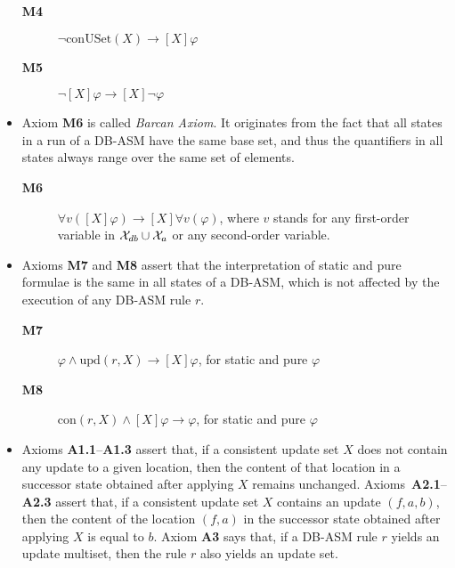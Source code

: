 \documentclass[preprint,11pt]{elsarticle}
\theoremstyle{definition}
\theoremstyle{remark}
\begin{document}
\begin{itemize}
\begin{description}
  \item[\textbf{M4}] $\neg \mathrm{conUSet}(X)\rightarrow[X]\varphi $ \smallskip


  \item[\textbf{M5}] $\neg[X]\varphi\rightarrow [X]\neg\varphi$ \smallskip

\end{description}

\item Axiom \textbf{M6} is called \emph{Barcan Axiom}. It originates from the fact that all
states in a run of a DB-ASM have the same base set, and thus the
quantifiers in all states always range over the same set of
elements. 

\begin{description}

\item[\textbf{M6}] $\forall v ([X]\varphi)\rightarrow [X]\forall
v(\varphi)$, where $v$ stands for any first-order variable in ${\cal X}_{db} \cup {\cal X}_{a}$ or any second-order variable. \smallskip

\end{description}


\item Axioms \textbf{M7} and \textbf{M8} assert that the interpretation of static and pure formulae is the same in all states of a DB-ASM, which is not affected by the execution of any DB-ASM rule $r$. 

\begin{description}
  \item[\textbf{M7}] $\varphi  \wedge \mathrm{upd}(r, X) \rightarrow  [X]\varphi$, for
  static and pure $\varphi$\smallskip

  \item[\textbf{M8}]  con$(r,X)\wedge[X]\varphi\rightarrow
  \varphi$, for static and pure $\varphi$\smallskip

\end{description}


\item Axioms \textbf{A1.1}--\textbf{A1.3} assert that, if a consistent update set $X$ does
not contain any update to a given location, then the
content of that location in a successor state obtained after
applying $X$ remains unchanged. 
Axioms~\textbf{A2.1}--\textbf{A2.3} assert that, if a consistent update set $X$
contains an update $(f,a,b)$, then the content of the location $(f,a)$ in
the successor state obtained after applying $X$ is equal to
$b$. Axiom \textbf{A3} says that, if a DB-ASM
rule $r$ yields an update multiset, then the rule $r$ also yields an
update set.


\end{itemize}
\end{document}
